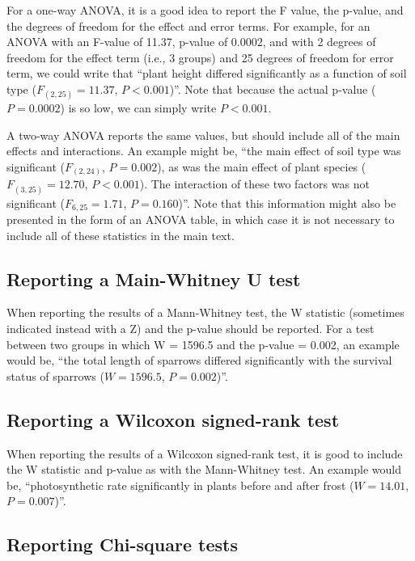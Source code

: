 \documentclass[
]{scrbook}
\begin{document}
For a one-way ANOVA, it is a good idea to report the F value, the p-value, and the degrees of freedom for the effect and error terms.
For example, for an ANOVA with an F-value of 11.37, p-value of 0.0002, and with 2 degrees of freedom for the effect term (i.e., 3 groups) and 25 degrees of freedom for error term, we could write that ``plant height differed significantly as a function of soil type (\(F_{(2, 25)} = 11.37\), \(P < 0.001\))''.
Note that because the actual p-value (\(P = 0.0002\)) is so low, we can simply write \(P < 0.001\).

A two-way ANOVA reports the same values, but should include all of the main effects and interactions. An example might be, ``the main effect of soil type was significant (\(F_{(2, 24)}\), \(P = 0.002\)), as was the main effect of plant species (\(F_{(3, 25)} = 12.70\), \(P < 0.001\)). The interaction of these two factors was not significant (\(F_{6, 25} = 1.71\), \(P = 0.160\))''.
Note that this information might also be presented in the form of an ANOVA table, in which case it is not necessary to include all of these statistics in the main text.

\hypertarget{reporting-a-main-whitney-u-test}{%
\subsection{Reporting a Main-Whitney U test}\label{reporting-a-main-whitney-u-test}}

When reporting the results of a Mann-Whitney test, the W statistic (sometimes indicated instead with a Z) and the p-value should be reported.
For a test between two groups in which W = 1596.5 and the p-value = 0.002, an example would be, ``the total length of sparrows differed significantly with the survival status of sparrows (\(W = 1596.5\), \(P = 0.002\))''.

\hypertarget{reporting-a-wilcoxon-signed-rank-test}{%
\subsection{Reporting a Wilcoxon signed-rank test}\label{reporting-a-wilcoxon-signed-rank-test}}

When reporting the results of a Wilcoxon signed-rank test, it is good to include the W statistic and p-value as with the Mann-Whitney test.
An example would be, ``photosynthetic rate significantly in plants before and after frost (\(W = 14.01\), \(P = 0.007\))''.

\hypertarget{reporting-chi-square-tests}{%
\subsection{Reporting Chi-square tests}\label{reporting-chi-square-tests}}
\end{document}
